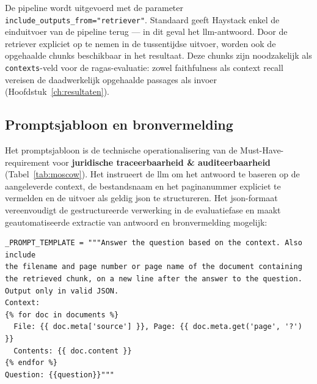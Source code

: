 De pipeline wordt uitgevoerd met de parameter\\\texttt{include_outputs_from={"retriever"}}. Standaard geeft Haystack enkel de einduitvoer van de pipeline terug — in dit geval het \gls{llm}-antwoord. Door de retriever expliciet op te nemen in de tussentijdse uitvoer, worden ook de opgehaalde chunks beschikbaar in het resultaat. Deze chunks zijn noodzakelijk als \texttt{contexts}-veld voor de \gls{ragas}-evaluatie: zowel faithfulness als context recall vereisen de daadwerkelijk opgehaalde passages als invoer (Hoofdstuk~\ref{ch:resultaten}).

\subsection{Promptsjabloon en bronvermelding}
\label{subsec:prompt-template}

Het promptsjabloon is de technische operationalisering van de Must-Have-requirement voor \textbf{juridische traceerbaarheid \& auditeerbaarheid} (Tabel~\ref{tab:moscow}). Het instrueert de \gls{llm} om het antwoord te baseren op de aangeleverde context, de bestandsnaam en het paginanummer expliciet te vermelden en de uitvoer als geldig \gls{json} te structureren. Het \gls{json}-formaat vereenvoudigt de gestructureerde verwerking in de evaluatiefase en maakt geautomatiseerde extractie van antwoord en bronvermelding mogelijk:

\begin{listing}[H]
\begin{verbatim}
_PROMPT_TEMPLATE = """Answer the question based on the context. Also include
the filename and page number or page name of the document containing
the retrieved chunk, on a new line after the answer to the question.
Output only in valid JSON.
Context:
{% for doc in documents %}
  File: {{ doc.meta['source'] }}, Page: {{ doc.meta.get('page', '?') }}
  Contents: {{ doc.content }}
{% endfor %}
Question: {{question}}"""
\end{verbatim}
\caption[Promptsjabloon voor de querypipeline]{Het sjabloon verplicht een antwoord in \gls{json}-formaat met expliciete bronvermelding van bestandsnaam en paginanummer. De metadata-sleutels \texttt{source} en \texttt{page} zijn door de \texttt{DocumentCleaner} en \texttt{ChunkMetaCleaner} genormaliseerd en gegarandeerd aanwezig in elke chunk (Secties~\ref{subsec:documentcleaner}--\ref{subsec:chunkmetacleaner}). Het sjabloon is voor de leesbaarheid vertaald naar het Engels; het origineel is in het Italiaans opgesteld.}
\label{lst:prompt-template}
\end{listing}

